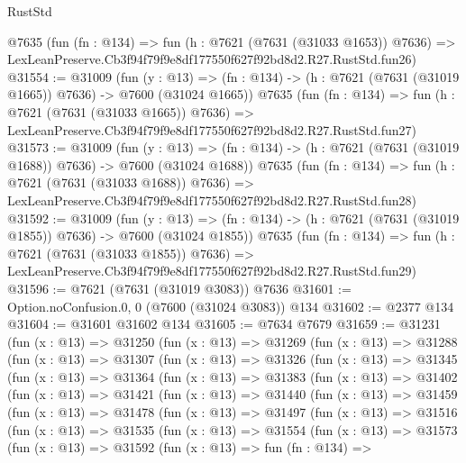 \begin{lexlean}{RustStd}
\begin{coremodule}
    @7635
    (fun (fn : @134) =>
    fun (h : @7621 (@7631 (@31033 @1653)) @7636) =>
    LexLeanPreserve.Cb3f94f79f9e8df177550f627f92bd8d2.R27.RustStd.fun26)
@31554 := @31009
    (fun (y : @13) =>
    (fn : @134) -> (h : @7621 (@7631 (@31019 @1665)) @7636) -> @7600 (@31024 @1665))
    @7635
    (fun (fn : @134) =>
    fun (h : @7621 (@7631 (@31033 @1665)) @7636) =>
    LexLeanPreserve.Cb3f94f79f9e8df177550f627f92bd8d2.R27.RustStd.fun27)
@31573 := @31009
    (fun (y : @13) =>
    (fn : @134) -> (h : @7621 (@7631 (@31019 @1688)) @7636) -> @7600 (@31024 @1688))
    @7635
    (fun (fn : @134) =>
    fun (h : @7621 (@7631 (@31033 @1688)) @7636) =>
    LexLeanPreserve.Cb3f94f79f9e8df177550f627f92bd8d2.R27.RustStd.fun28)
@31592 := @31009
    (fun (y : @13) =>
    (fn : @134) -> (h : @7621 (@7631 (@31019 @1855)) @7636) -> @7600 (@31024 @1855))
    @7635
    (fun (fn : @134) =>
    fun (h : @7621 (@7631 (@31033 @1855)) @7636) =>
    LexLeanPreserve.Cb3f94f79f9e8df177550f627f92bd8d2.R27.RustStd.fun29)
@31596 := @7621 (@7631 (@31019 @3083)) @7636
@31601 := Option.noConfusion.{0, 0} (@7600 (@31024 @3083)) @134
@31602 := @2377 @134
@31604 := @31601 @31602 @134
@31605 := @7634 @7679
@31659 := @31231
    (fun (x : @13) =>
    @31250
      (fun (x : @13) =>
      @31269
        (fun (x : @13) =>
        @31288
          (fun (x : @13) =>
          @31307
            (fun (x : @13) =>
            @31326
              (fun (x : @13) =>
              @31345
                (fun (x : @13) =>
                @31364
                  (fun (x : @13) =>
                  @31383
                    (fun (x : @13) =>
                    @31402
                      (fun (x : @13) =>
                      @31421
                        (fun (x : @13) =>
                        @31440
                          (fun (x : @13) =>
                          @31459
                            (fun (x : @13) =>
                            @31478
                              (fun (x : @13) =>
                              @31497
                                (fun (x : @13) =>
                                @31516
                                  (fun (x : @13) =>
                                  @31535
                                    (fun (x : @13) =>
                                    @31554
                                      (fun (x : @13) =>
                                      @31573
                                        (fun (x : @13) =>
                                        @31592
                                          (fun (x : @13) =>
                                          fun (fn : @134) =>

\end{coremodule}
\end{lexlean}
